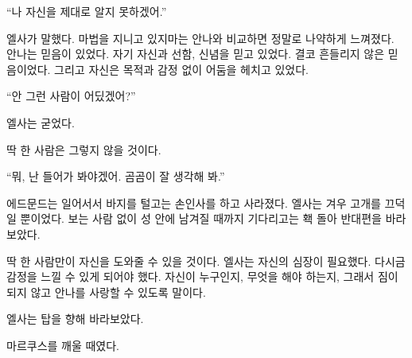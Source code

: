 ``나 자신을 제대로 알지 못하겠어.''

엘사가 말했다. 마법을 지니고 있지마는 안나와 비교하면 정말로 나약하게 느껴졌다. 안나는 믿음이 있었다. 자기 자신과 선함, 신념을 믿고 있었다. 결코 흔들리지 않은 믿음이었다. 그리고 자신은 목적과 감정 없이 어둠을 헤치고 있었다.

``안 그런 사람이 어딨겠어?''

엘사는 굳었다.

딱 한 사람은 그렇지 않을 것이다.

``뭐, 난 들어가 봐야겠어. 곰곰이 잘 생각해 봐.''

에드문드는 일어서서 바지를 털고는 손인사를 하고 사라졌다. 엘사는 겨우 고개를 끄덕일 뿐이었다. 보는 사람 없이 성 안에 남겨질 때까지 기다리고는 홱 돌아 반대편을 바라보았다.

딱 한 사람만이 자신을 도와줄 수 있을 것이다. 엘사는 자신의 심장이 필요했다. 다시금 감정을 느낄 수 있게 되어야 했다. 자신이 누구인지, 무엇을 해야 하는지, 그래서 짐이 되지 않고 안나를 사랑할 수 있도록 말이다.

엘사는 탑을 향해 바라보았다.

마르쿠스를 깨울 때였다.


